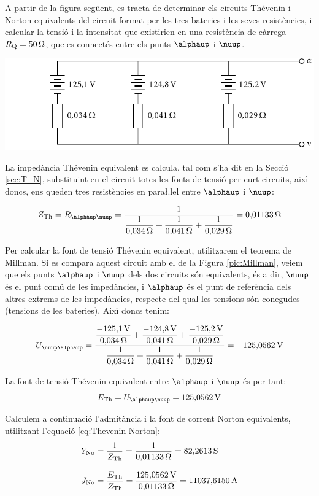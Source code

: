 \begin{exemple}

A partir de la figura seg\"{u}ent, es tracta de determinar els circuits
Th\'{e}venin i Norton equivalents del circuit format per les tres
bateries i les seves resist\`{e}ncies, i calcular la tensi\'{o} i la
intensitat que existirien en una resist\`{e}ncia de c\`{a}rrega
$R_\mathrm{Q}=50\mathrm{\,\mathrm{\Omega}}$, que es connect\'{e}s entre els punts $\alphaup$
i $\nuup$.

\includegraphics{Imatges/Cap-Fonaments-Millman-Exemple.pdf}

La imped\`{a}ncia Th\'{e}venin equivalent es calcula, tal com s'ha dit en la Secci\'{o} \ref{sec:T_N},
substituint en el circuit totes les fonts de tensi\'{o} per curt circuits, aix\'{\i} doncs, ens
queden tres resist\`{e}ncies en para{\l.l}el entre $\alphaup$ i $\nuup$:

\[
Z\ped{Th} = R_{\alphaup\nuup} =\frac{1}{\dfrac{1}{0{,}034\unit{\ohm}} +
\dfrac{1}{0{,}041\unit{\ohm}} + \dfrac{1}{0{,}029\unit{\ohm}}} =
0{,}01133\unit{\ohm}
\]

Per calcular la font de tensi\'{o} Th\'{e}venin equivalent, utilitzarem el
teorema de Millman. Si es compara aquest circuit amb el de la Figura
\vref{pic:Millman}, veiem que els punts $\alphaup$ i $\nuup$ dels dos
circuits s\'{o}n equivalents, \'{e}s a dir, $\nuup$ \'{e}s el punt com\'{u} de les
imped\`{a}ncies, i $\alphaup$ \'{e}s el punt de refer\`{e}ncia dels altres extrems
de les imped\`{a}ncies, respecte del qual les tensions s\'{o}n conegudes
(tensions de les bateries). Aix\'{\i} doncs tenim:

\[
U_{\nuup\alphaup} = \frac{\dfrac{-125{,}1\unit{V}}{0{,}034\unit{\ohm}} +
\dfrac{-124{,}8\unit{V}}{0{,}041\unit{\ohm}} +
\dfrac{-125{,}2\unit{V}}{0{,}029\unit{\ohm}}}{\dfrac{1}{0{,}034\unit{\ohm}}
+ \dfrac{1}{0{,}041\unit{\ohm}} + \dfrac{1}{0{,}029\unit{\ohm}}} =
-125{,}0562\unit{V}
\]

La font de tensi\'{o}  Th\'{e}venin equivalent entre $\alphaup$ i $\nuup$ \'{e}s per
tant:
\[
E\ped{Th} = U_{\alphaup\nuup} = 125{,}0562\unit{V}
\]

Calculem a continuaci\'{o} l'admit\`{a}ncia i la font de corrent  Norton equivalents, utilitzant
l'equaci\'{o} \eqref{eq:Thevenin-Norton}:
\begin{align*}
    Y_\mathrm{No} &= \frac{1}{Z_\mathrm{Th}} = \frac{1}{0{,}01133\mathrm{\,\mathrm{\Omega}}} = 82{,}2613\mathrm{\,S}
    \\[2ex]
    J_\mathrm{No} &= \frac{E_\mathrm{Th}}{Z_\mathrm{Th}} =
    \frac{125{,}0562\mathrm{\,V}}{0{,}01133\mathrm{\,\mathrm{\Omega}}}= 11037{,}6150\mathrm{\,A}
\end{align*}


\end{exemple}

